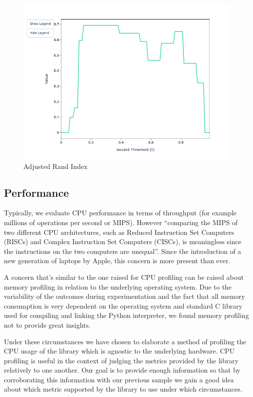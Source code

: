 \documentclass[a4paper,twoside]{article}
\begin{document}
\begin{figure}[h!]
\begin{minipage}{0.32\textwidth}
            \includegraphics[width=\textwidth]{sample-usage/mini-alg-ari}
            \caption{Adjusted Rand Index}
        \end{minipage}
    \end{figure}

    \subsection{Performance}

    Typically, we evaluate CPU performance in terms of throughput (for example
    millions of operations per second or MIPS).
    However ``comparing the MIPS of two different CPU architectures, such as
    Reduced Instruction Set Computers (RISCs) and Complex Instruction Set
    Computers (CISCs), is meaningless since the instructions on the two
    computers are unequal''\cite{jain1991profiling}.
    Since the introduction of a new generation of laptops by Apple, this concern
    is more present than ever.

    A concern that's similar to the one raised for CPU profiling can be raised
    about memory profiling in relation to the underlying operating system.
    Due to the variability of the outcomes during experimentation and the fact
    that all memory consumption is very dependent on the operating system and
    standard C library used for compiling and linking the Python interpreter,
    we found memory profiling not to provide great insights.

    Under these circumstances we have chosen to elaborate a method of profiling
    the CPU usage of the library which is agnostic to the underlying hardware.
    CPU profiling is useful in the context of judging the metrics provided by
    the library relatively to one another.
    Our goal is to provide enough information so that by corroborating this
    information with our previous sample we gain a good idea about which metric
    supported by the library to use under which circumstances.
    
\end{document}
